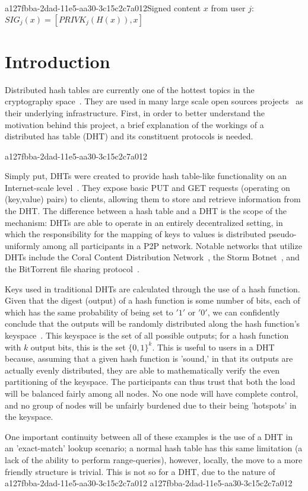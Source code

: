 \documentclass[12pt]{article}
\begin{document}
a127fbba-2dad-11e5-aa30-3c15c2c7a012Signed content $x$ from user $j$: $SIG_j(x) = \left[ PRIVK_j( H(x) ), x \right]$

\section{Introduction}
\par Distributed hash tables are currently one of the hottest topics in the cryptography space~\cite{Stoica:2001dj,Rowstron:2001ea,Ratnasamy:2001wn}. They are used in many large scale open sources projects~\cite{Freitas:2013tb,Xu:2010vs,Perfitt:2010fh} as their underlying infrastructure. First, in order to better understand the motivation behind this project, a brief explanation of the workings of a distributed has table (DHT) and its constituent protocols is needed.

a127fbba-2dad-11e5-aa30-3c15c2c7a012\par Simply put, DHTs were created to provide hash table-like functionality on an Internet-scale level~\cite{Ratnasamy:2001wn}. They expose basic PUT and GET requests (operating on (key,value) pairs) to clients, allowing them to store and retrieve information from the DHT. The difference between a hash table and a DHT is the scope of the mechanism: DHTs are able to operate in an entirely decentralized setting, in which the responsibility for the mapping of keys to values is distributed pseudo-uniformly among all participants in a P2P network. Notable networks that utilize DHTs include the Coral Content Distribution Network~\cite{Freedman:2004vb}, the Storm Botnet~\cite{Holz:2008uk}, and the BitTorrent file sharing protocol~\cite{Cohen:y1_8mBnw}.

\par Keys used in traditional DHTs are calculated through the use of a hash function. Given that the digest (output) of a hash function is some number of bits, each of which has the same probability of being set to $'1'$ or $'0'$, we can confidently conclude that the outputs will be randomly distributed along the hash function's keyspace~. This keyspace is the set of all possible outputs; for a hash function with $k$ output bits, this is the set $\{0,1\}^k$. This is useful to users in a DHT because, assuming that a given hash function is 'sound,' in that its outputs are actually evenly distributed, they are able to mathematically verify the even partitioning of the keyspace. The participants can thus trust that both the load will be balanced fairly among all nodes. No one node will have complete control, and no group of nodes will be unfairly burdened due to their being 'hotspots' in the keyspace.~

\par One important continuity between all of these examples is the use of a DHT in an 'exact-match' lookup scenario; a normal hash table has this same limitation (a lack of the ability to perform range-queries), however, locally, the move to a more friendly structure is trivial. This is not so for a DHT, due to the nature of
a127fbba-2dad-11e5-aa30-3c15c2c7a012\printbibliography
a127fbba-2dad-11e5-aa30-3c15c2c7a012
\end{document}
